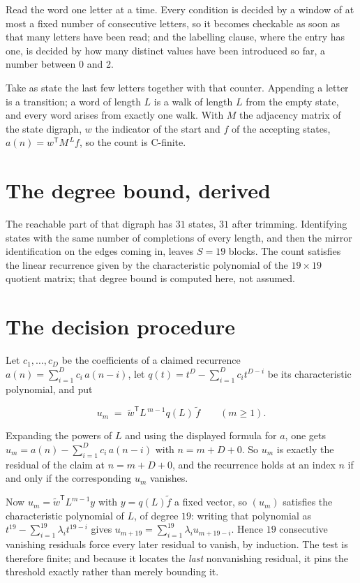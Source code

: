 \documentclass[11pt]{article}
\theoremstyle{definition}
\begin{document}
Read the word one letter at a time. Every condition is decided by a window of at most a fixed number of consecutive letters, so it becomes checkable as soon as that many letters have been read; and the labelling clause, where the entry has one, is decided by how many distinct values have been introduced so far, a number between $0$ and 2.

Take as state the last few letters together with that counter. Appending a letter is a transition; a word of length $L$ is a walk of length $L$ from the empty state, and every word arises from exactly one walk. With $M$ the adjacency matrix of the state digraph, $w$ the indicator of the start and $f$ of the accepting states, $a(n) = w^{\mathsf T}M^{\,L}f$, so the count is C-finite.

\section{The degree bound, derived}

The reachable part of that digraph has $31$ states, $31$ after trimming. Identifying states with the same number of completions of every length, and then the mirror identification on the edges coming in, leaves $S = 19$ blocks. The count satisfies the linear recurrence given by the characteristic polynomial of the $19\times19$ quotient matrix; that degree bound is computed here, not assumed.

\section{The decision procedure}

Let $c_1,\dots,c_D$ be the coefficients of a claimed recurrence $a(n) = \sum_{i=1}^{D} c_i\,a(n-i)$, let $q(t) = t^{D} - \sum_{i=1}^{D} c_i t^{D-i}$ be its characteristic polynomial, and put

\[u_m \;=\; \tilde w^{\mathsf T} L^{\,m-1} q(L)\,\tilde f \qquad (m \ge 1).\]

Expanding the powers of $L$ and using the displayed formula for $a$, one gets $u_m = a(n) - \sum_{i=1}^{D} c_i\,a(n-i)$ with $n = m + D + 0$. So $u_m$ is exactly the residual of the claim at $n = m + D + 0$, and the recurrence holds at an index $n$ if and only if the corresponding $u_m$ vanishes.

Now $u_m = \tilde w^{\mathsf T} L^{m-1} y$ with $y = q(L)\tilde f$ a fixed vector, so $(u_m)$ satisfies the characteristic polynomial of $L$, of degree $19$: writing that polynomial as $t^{19} - \sum_{i=1}^{19} \lambda_i t^{19-i}$ gives $u_{m+19} = \sum_{i=1}^{19} \lambda_i u_{m+19-i}$. Hence $19$ consecutive vanishing residuals force every later residual to vanish, by induction. The test is therefore finite; and because it locates the {\itshape last} nonvanishing residual, it pins the threshold exactly rather than merely bounding it.
\end{document}
